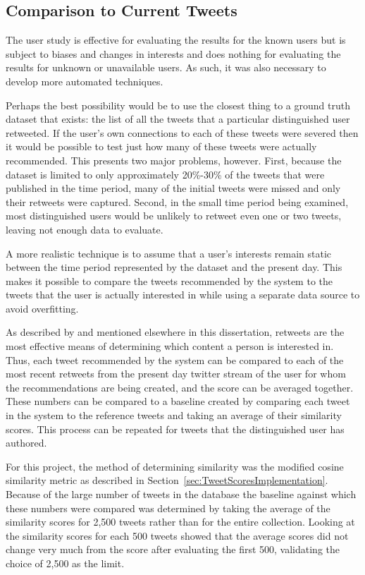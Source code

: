 \subsection{Comparison to Current Tweets}
\label{sec:ComparisonToCurrentTweets}

The user study is effective for evaluating the results for the known users but is subject to biases and changes in interests and does nothing for evaluating the results for unknown or unavailable users. As such, it was also necessary to develop more automated techniques.

Perhaps the best possibility would be to use the closest thing to a ground truth dataset that exists: the list of all the tweets that a particular distinguished user retweeted. If the user's own connections to each of these tweets were severed then it would be possible to test just how many of these tweets were actually recommended. This presents two major problems, however. First, because the dataset is limited to only approximately 20\%-30\% of the tweets that were published in the time period, many of the initial tweets were missed and only their retweets were captured. Second, in the small time period being examined, most distinguished users would be unlikely to retweet even one or two tweets, leaving not enough data to evaluate.

A more realistic technique is to assume that a user's interests remain static between the time period represented by the dataset and the present day. This makes it possible to compare the tweets recommended by the system to the tweets that the user is actually interested in while using a separate data source to avoid overfitting.

As described by \cite{Welch2011} and mentioned elsewhere in this dissertation, retweets are the most effective means of determining which content a person is interested in. Thus, each tweet recommended by the system can be compared to each of the most recent retweets from the present day twitter stream of the user for whom the recommendations are being created, and the score can be averaged together. These numbers can be compared to a baseline created by comparing each tweet in the system to the reference tweets and taking an average of their similarity scores. This process can be repeated for tweets that the distinguished user has authored.

For this project, the method of determining similarity was the modified cosine similarity metric as described in Section~\ref{sec:TweetScoresImplementation}. Because of the large number of tweets in the database the baseline against which these numbers were compared was determined by taking the average of the similarity scores for 2,500 tweets rather than for the entire collection. Looking at the similarity scores for each 500 tweets showed that the average scores did not change very much from the score after evaluating the first 500, validating the choice of 2,500 as the limit.

